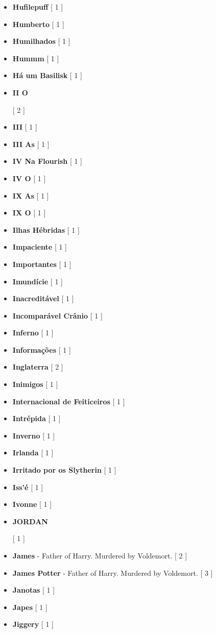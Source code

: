 \documentclass[a4paper]{article}
\begin{document}
\begin{itemize}
	\item \textbf{Hufilepuff} [ 1 ]
	\item \textbf{Humberto} [ 1 ]
	\item \textbf{Humilhados} [ 1 ]
	\item \textbf{Hummm} [ 1 ]
	\item \textbf{Há um Basilisk} [ 1 ]
	\item \hypertarget{I}{\textbf{II O}} [ 2 ]
	\item \textbf{III} [ 1 ]
	\item \textbf{III As} [ 1 ]
	\item \textbf{IV Na Flourish} [ 1 ]
	\item \textbf{IV O} [ 1 ]
	\item \textbf{IX As} [ 1 ]
	\item \textbf{IX O} [ 1 ]
	\item \textbf{Ilhas Hébridas} [ 1 ]
	\item \textbf{Impaciente} [ 1 ]
	\item \textbf{Importantes} [ 1 ]
	\item \textbf{Imundície} [ 1 ]
	\item \textbf{Inacreditável} [ 1 ]
	\item \textbf{Incomparável Crânio} [ 1 ]
	\item \textbf{Inferno} [ 1 ]
	\item \textbf{Informações} [ 1 ]
	\item \textbf{Inglaterra} [ 2 ]
	\item \textbf{Inimigos} [ 1 ]
	\item \textbf{Internacional de Feiticeiros} [ 1 ]
	\item \textbf{Intrépida} [ 1 ]
	\item \textbf{Inverno} [ 1 ]
	\item \textbf{Irlanda} [ 1 ]
	\item \textbf{Irritado por os Slytherin} [ 1 ]
	\item \textbf{Iss'é} [ 1 ]
	\item \textbf{Ivonne} [ 1 ]
	\item \hypertarget{J}{\textbf{JORDAN}} [ 1 ]
	\item \textbf{James} - Father of Harry. Murdered by Voldemort. [ 2 ]
	\item \textbf{James Potter} - Father of Harry. Murdered by Voldemort. [ 3 ]
	\item \textbf{Janotas} [ 1 ]
	\item \textbf{Japes} [ 1 ]
	\item \textbf{Jiggery} [ 1 ]

\end{itemize}
\end{document}
